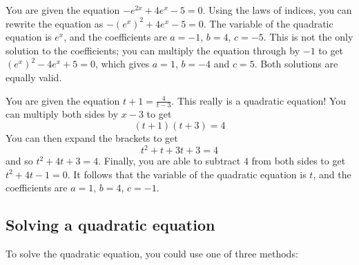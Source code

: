 \documentclass[
  12pt,
  a4paper, oneside]{starmastarticle}
\begin{document}
\begin{tcolorbox}[enhanced jigsaw, bottomrule=.15mm, colback=white, opacityback=0, rightrule=.15mm, breakable, left=2mm, arc=.35mm, toprule=.15mm, colframe=quarto-callout-note-color-frame, leftrule=.75mm]
\begin{minipage}[t]{5.5mm}
\textcolor{quarto-callout-note-color}{\faInfo}
\end{minipage}%
\begin{minipage}[t]{\textwidth - 5.5mm}
You are given the equation \(-e^{2x} + 4e^{x} - 5 = 0\). Using the laws
of indices, you can rewrite the equation as
\(-(e^{x})^2 + 4e^x - 5 = 0\). The variable of the quadratic equation is
\(e^x\), and the coefficients are \(a = -1\), \(b = 4\), \(c = -5\).
This is not the only solution to the coefficients; you can multiply the
equation through by \(-1\) to get \((e^{x})^2 - 4e^x + 5 = 0\), which
gives \(a = 1\), \(b = -4\) and \(c = 5\). Both solutions are equally
valid.\end{minipage}%
\end{tcolorbox}

\begin{tcolorbox}[enhanced jigsaw, bottomrule=.15mm, colback=white, opacityback=0, rightrule=.15mm, breakable, left=2mm, arc=.35mm, toprule=.15mm, colframe=quarto-callout-note-color-frame, leftrule=.75mm]
\begin{minipage}[t]{5.5mm}
\textcolor{quarto-callout-note-color}{\faInfo}
\end{minipage}%
\begin{minipage}[t]{\textwidth - 5.5mm}
You are given the equation \(t+1 = \frac{4}{t-3}\). This really is a
quadratic equation! You can multiply both sides by \(x - 3\) to get
\[(t+1)(t+3) = 4\] You can then expand the brackets to get
\[t^2 + t + 3t + 3 = 4\] and so \(t^2 + 4t + 3 = 4\). Finally, you are
able to subtract \(4\) from both sides to get \(t^2 + 4t - 1 = 0\). It
follows that the variable of the quadratic equation is \(t\), and the
coefficients are \(a = 1\), \(b = 4\), \(c = -1\).\end{minipage}%
\end{tcolorbox}

\hypertarget{solving-a-quadratic-equation}{%
\subsection{Solving a quadratic
equation}\label{solving-a-quadratic-equation}}

To solve the quadratic equation, you could use one of three methods:
\end{document}
